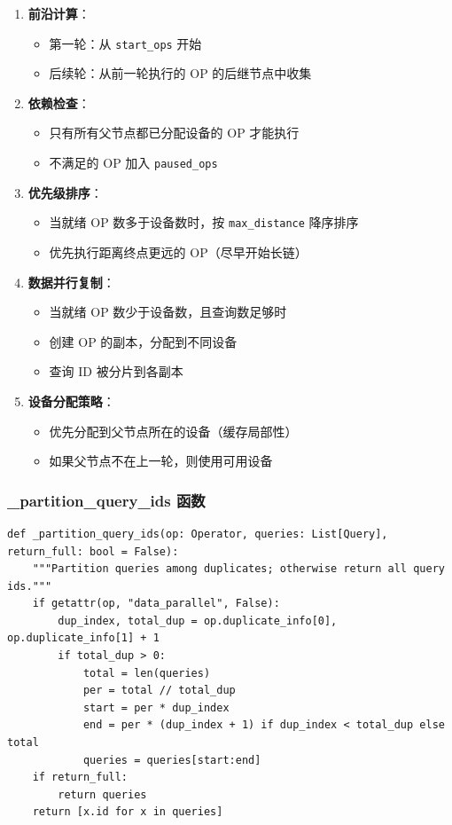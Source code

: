 \documentclass[12pt,a4paper]{article}
\begin{document}
\begin{enumerate}
    \item \textbf{前沿计算}：
    \begin{itemize}
        \item 第一轮：从 \texttt{start_ops} 开始
        \item 后续轮：从前一轮执行的 OP 的后继节点中收集
    \end{itemize}
    
    \item \textbf{依赖检查}：
    \begin{itemize}
        \item 只有所有父节点都已分配设备的 OP 才能执行
        \item 不满足的 OP 加入 \texttt{paused_ops}
    \end{itemize}
    
    \item \textbf{优先级排序}：
    \begin{itemize}
        \item 当就绪 OP 数多于设备数时，按 \texttt{max_distance} 降序排序
        \item 优先执行距离终点更远的 OP（尽早开始长链）
    \end{itemize}
    
    \item \textbf{数据并行复制}：
    \begin{itemize}
        \item 当就绪 OP 数少于设备数，且查询数足够时
        \item 创建 OP 的副本，分配到不同设备
        \item 查询 ID 被分片到各副本
    \end{itemize}
    
    \item \textbf{设备分配策略}：
    \begin{itemize}
        \item 优先分配到父节点所在的设备（缓存局部性）
        \item 如果父节点不在上一轮，则使用可用设备
    \end{itemize}
\end{enumerate}

\subsubsection{\_partition\_query\_ids 函数}

\begin{lstlisting}
def _partition_query_ids(op: Operator, queries: List[Query], return_full: bool = False):
    """Partition queries among duplicates; otherwise return all query ids."""
    if getattr(op, "data_parallel", False):
        dup_index, total_dup = op.duplicate_info[0], op.duplicate_info[1] + 1
        if total_dup > 0:
            total = len(queries)
            per = total // total_dup
            start = per * dup_index
            end = per * (dup_index + 1) if dup_index < total_dup else total
            queries = queries[start:end]
    if return_full:
        return queries
    return [x.id for x in queries]
\end{lstlisting}
\end{document}
